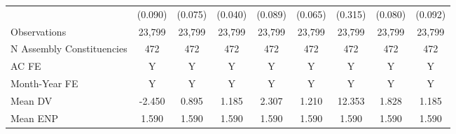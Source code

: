 {\begin{tabular}{l*{8}{c}}
            &     (0.090)         &     (0.075)         &     (0.040)         &     (0.089)         &     (0.065)         &     (0.315)         &     (0.080)         &     (0.092)         \\
Observations&      23,799         &      23,799         &      23,799         &      23,799         &      23,799         &      23,799         &      23,799         &      23,799         \\
N Assembly Constituencies&         472         &         472         &         472         &         472         &         472         &         472         &         472         &         472         \\
AC FE       &           Y         &           Y         &           Y         &           Y         &           Y         &           Y         &           Y         &           Y         \\
Month-Year FE&           Y         &           Y         &           Y         &           Y         &           Y         &           Y         &           Y         &           Y         \\
Mean DV     &      -2.450         &       0.895         &       1.185         &       2.307         &       1.210         &      12.353         &       1.828         &       1.185         \\
Mean ENP    &       1.590         &       1.590         &       1.590         &       1.590         &       1.590         &       1.590         &       1.590         &       1.590         \\
\bottomrule
\end{tabular}
}
